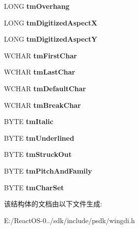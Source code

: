 \begin{DoxyCompactItemize}
\item 
\mbox{\label{structtag_t_e_x_t_m_e_t_r_i_c_w_a5dbe17d5b05d39e3f3c7bb8ca2b49a26}} 
L\+O\+NG {\bfseries tm\+Overhang}
\item 
\mbox{\label{structtag_t_e_x_t_m_e_t_r_i_c_w_a32bb18751edb9457b21bbeefaeb9a989}} 
L\+O\+NG {\bfseries tm\+Digitized\+AspectX}
\item 
\mbox{\label{structtag_t_e_x_t_m_e_t_r_i_c_w_a5b56f93a9cd558f84fe501cdcdd88518}} 
L\+O\+NG {\bfseries tm\+Digitized\+AspectY}
\item 
\mbox{\label{structtag_t_e_x_t_m_e_t_r_i_c_w_a235de3f6524fe663c8fd284fc06175e7}} 
W\+C\+H\+AR {\bfseries tm\+First\+Char}
\item 
\mbox{\label{structtag_t_e_x_t_m_e_t_r_i_c_w_ad30a2f039e79c9cdd3d9ed9955b40771}} 
W\+C\+H\+AR {\bfseries tm\+Last\+Char}
\item 
\mbox{\label{structtag_t_e_x_t_m_e_t_r_i_c_w_ab2476578d804c170f6aaa9e75cb32dba}} 
W\+C\+H\+AR {\bfseries tm\+Default\+Char}
\item 
\mbox{\label{structtag_t_e_x_t_m_e_t_r_i_c_w_aa8d3b895c0db3607a6e3077807e69605}} 
W\+C\+H\+AR {\bfseries tm\+Break\+Char}
\item 
\mbox{\label{structtag_t_e_x_t_m_e_t_r_i_c_w_a6d504f0bbdab1aa7a4705de57ae8058a}} 
B\+Y\+TE {\bfseries tm\+Italic}
\item 
\mbox{\label{structtag_t_e_x_t_m_e_t_r_i_c_w_a7ed4e651bb203cc62ee3bf6d2c54968a}} 
B\+Y\+TE {\bfseries tm\+Underlined}
\item 
\mbox{\label{structtag_t_e_x_t_m_e_t_r_i_c_w_a75cd856cba25379878064202ae186699}} 
B\+Y\+TE {\bfseries tm\+Struck\+Out}
\item 
\mbox{\label{structtag_t_e_x_t_m_e_t_r_i_c_w_a9dad2ffcb9fcd6f5ff2a357b8d3bad3b}} 
B\+Y\+TE {\bfseries tm\+Pitch\+And\+Family}
\item 
\mbox{\label{structtag_t_e_x_t_m_e_t_r_i_c_w_ab6fda6b80fc71443eb4251ee32e71de1}} 
B\+Y\+TE {\bfseries tm\+Char\+Set}
\end{DoxyCompactItemize}


该结构体的文档由以下文件生成\+:\begin{DoxyCompactItemize}
\item 
E\+:/\+React\+O\+S-\/0../sdk/include/psdk/wingdi.\+h\end{DoxyCompactItemize}

